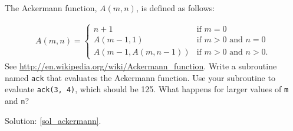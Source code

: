 \begin{exercise}
\label{ackermann}

The Ackermann function, $A(m, n)$, is defined as follows:

\begin{eqnarray*}
A(m, n) = \begin{cases} 
              n+1 & \mbox{if } m = 0 \\ 
        A(m-1, 1) & \mbox{if } m > 0 \mbox{ and } n = 0 \\ 
A(m-1, A(m, n-1)) & \mbox{if } m > 0 \mbox{ and } n > 0.
\end{cases} 
\end{eqnarray*}
%
See \url{http://en.wikipedia.org/wiki/Ackermann_function}.
Write a subroutine named {\tt ack} that evaluates the Ackermann function.
Use your subroutine to evaluate {\tt ack(3, 4)}, which should be 125.
What happens for larger values of {\tt m} and {\tt n}?

Solution: \ref{sol_ackermann}.

\end{exercise}


